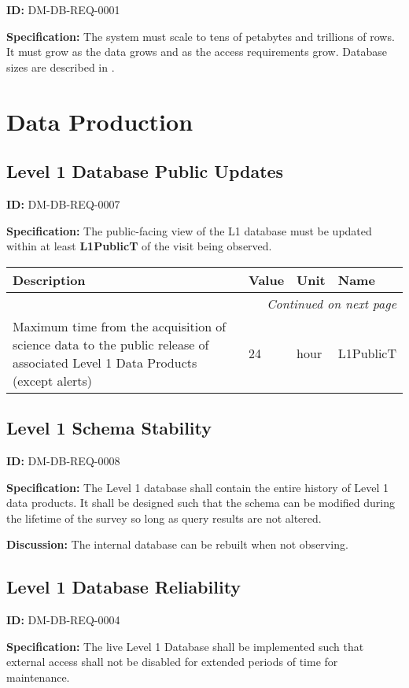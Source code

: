 \documentclass[DM,toc]{lsstdoc}
\makeatletter
\newcommand{\paramname}[1]{\hspace{0pt}#1}
\newcommand{\unitname}[1]{\hspace{0pt}#1}
\newenvironment{parameters}[0]{%
\setlength\LTleft{0pt}
\setlength\LTright{\fill}
\begin{small}
\begin{longtable}[]{|p{0.49\textwidth}|l|p{0.6in}|p{1.70in}@{}|}

\hline \textbf{Description} & \textbf{Value} & \textbf{Unit} & \textbf{Name} \\ \hline
\endhead

\hline \multicolumn{4}{r}{\emph{Continued on next page}} \\
\endfoot

\hline\hline
\endlastfoot
}{%
\hline
\end{longtable}
\end{small}
}
\makeatother
\begin{document}
\label{DM-DB-REQ-0001}
\textbf{ID:} DM-DB-REQ-0001

\textbf{Specification:}
The system must scale to tens of petabytes and trillions of rows. It must grow as the data grows and as the access requirements grow. Database sizes are described in .

\section{Data Production}

\subsection{Level 1 Database Public Updates}

\label{DM-DB-REQ-0007}
\textbf{ID:} DM-DB-REQ-0007

\textbf{Specification:}
The public-facing view of the L1 database must be updated within at least \textbf{L1PublicT} of the visit being observed.

\begin{parameters}
Maximum time from the acquisition of science data to the public release of associated Level 1 Data Products (except alerts)
&
24
&
\unitname{%
hour
}
&
\paramname{%
L1PublicT
} \\\hline
\end{parameters}

\subsection{Level 1 Schema Stability}

\label{DM-DB-REQ-0008}
\textbf{ID:} DM-DB-REQ-0008

\textbf{Specification:}
The Level 1 database shall contain the entire history of Level 1 data products. It shall be designed such that the schema can be modified during the lifetime of the survey so long as query results are not altered.

\textbf{Discussion:}
The internal database can be rebuilt when not observing.

\subsection{Level 1 Database Reliability}

\label{DM-DB-REQ-0004}
\textbf{ID:} DM-DB-REQ-0004

\textbf{Specification:}
The live Level 1 Database shall be implemented such that external access shall not be disabled for extended periods of time for maintenance.
\end{document}
